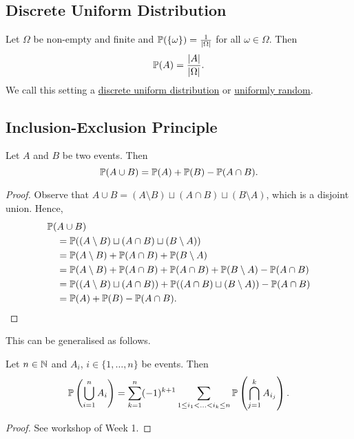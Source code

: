 \subsection{Discrete Uniform Distribution}
\begin{defn}
Let $\Omega$ be non-empty and finite and ${\mathbb P}(\{\omega\})= \frac{1}{\vert \Omega \vert }$ for all $\omega \in \Omega$.  Then
\[ {\mathbb P}(A) = \frac{ \vert A \vert }{ \vert \Omega \vert }. \]
We call this setting a \underline{discrete uniform distribution} or \underline{uniformly random}.
\end{defn}

\subsection{Inclusion-Exclusion Principle}

\begin{thm}
Let $A$ and $B$ be two events. Then
\[{\mathbb P}(A \cup B) = {\mathbb P}(A) + {\mathbb P}(B) - {\mathbb P}(A \cap B).\]
\end{thm}
\begin{proof}
Observe that $A \cup B = (A \setminus B) \sqcup (A \cap B) \sqcup (B \setminus A)$, which is a disjoint union. Hence,
\begin{align*}
{\mathbb P}(&A \cup B) 
\\ 
&= {\mathbb P}( (A \setminus B) \sqcup (A \cap B) \sqcup (B \setminus A) )
\\&
= {\mathbb P}(A \setminus B) + {\mathbb P}(A \cap B) + {\mathbb P}(B \setminus A)
\\&
= {\mathbb P}(A \setminus B) + {\mathbb P}(A \cap B) + {\mathbb P}(A \cap B) + {\mathbb P}(B \setminus A) - {\mathbb P}(A \cap B)
\\&
= {\mathbb P}((A \setminus B) \sqcup (A \cap B) ) + {\mathbb P}( (A \cap B) \sqcup (B \setminus A)) - {\mathbb P}( A \cap B)
\\&
= {\mathbb P}( A ) + {\mathbb P}(B) - {\mathbb P}( A \cap B).
\end{align*}
\end{proof}
\noindent This can be generalised as follows.
\begin{thm}
Let $n \in {\mathbb N}$ and $A_i$, $i\in \{ 1, \ldots, n \}$ be events. Then
\[{\mathbb P}\left(\bigcup_{i=1}^n A_i \right) = \sum_{k=1}^n (-1)^{k+1} \sum\limits_{1 \leq i_1 < \ldots < i_k \leq n} {\mathbb P}\left( \bigcap_{j=1}^k A_{i_j}\right).\]
\end{thm}
\begin{proof}
See workshop of Week 1.
\end{proof}


